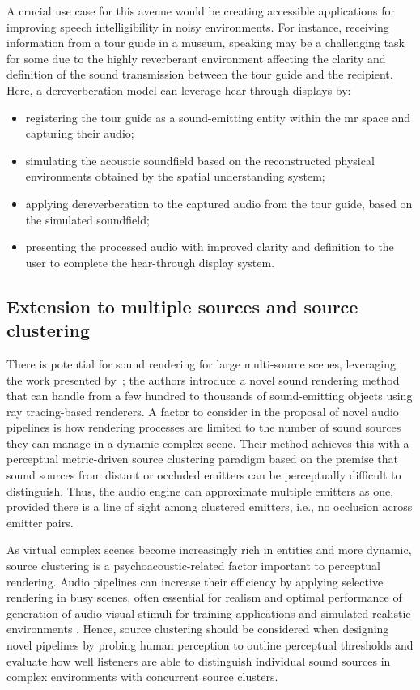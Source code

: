 A crucial use case for this avenue would be creating accessible applications for improving speech intelligibility in noisy environments. For instance, receiving information from a tour guide in a museum, speaking may be a challenging task for some due to the highly reverberant environment affecting the clarity and definition of the sound transmission between the tour guide and the recipient. Here, a dereverberation model can leverage hear-through displays by:
\begin{itemize}
    \item registering the tour guide as a sound-emitting entity within the \acrshort{mr} space and capturing their audio;
    \item simulating the acoustic soundfield based on the reconstructed physical environments obtained by the spatial understanding system;
    \item applying dereverberation to the captured audio from the tour guide, based on the simulated soundfield;
    \item presenting the processed audio with improved clarity and definition to the user to complete the hear-through display system.
\end{itemize}

\subsection{Extension to multiple sources and source clustering}
There is potential for sound rendering for large multi-source scenes, leveraging the work presented by~\cite{schissler2016interactive}; the authors introduce a novel sound rendering method that can handle from a few hundred to thousands of sound-emitting objects using ray tracing-based renderers. A factor to consider in the proposal of novel audio pipelines is how rendering processes are limited to the number of sound sources they can manage in a dynamic complex scene. Their method achieves this with a perceptual metric-driven source clustering paradigm based on the premise that sound sources from distant or occluded emitters can be perceptually difficult to distinguish. Thus, the audio engine can approximate multiple emitters as one, provided there is a line of sight among clustered emitters, i.e., no occlusion across emitter pairs.\par
As virtual complex scenes become increasingly rich in entities and more dynamic, source clustering is a psychoacoustic-related factor important to perceptual rendering. Audio pipelines can increase their efficiency by applying selective rendering in busy scenes, often essential for realism and optimal performance of generation of audio-visual stimuli for training applications and simulated realistic environments \citep{Woodward2021}. Hence, source clustering should be considered when designing novel pipelines by probing human perception to outline perceptual thresholds and evaluate how well listeners are able to distinguish individual sound sources in complex environments with concurrent source clusters.\par

